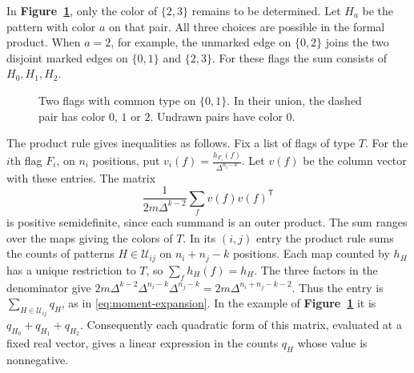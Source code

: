 In \textbf{Figure~\ref{fig:flag-union}}, only the color of $\{2,3\}$
remains to be determined. Let $H_a$ be the pattern with color $a$
on that pair. All three choices are possible in the formal product.
When $a=2$, for example, the unmarked edge on $\{0,2\}$ joins the
two disjoint marked edges on $\{0,1\}$ and $\{2,3\}$. For these flags
the sum consists of $H_0,H_1,H_2$.

\begin{figure}[htbp]
\centering
{}
\caption{Two flags with common type on $\{0,1\}$. In their union,
the dashed pair has color $0$, $1$ or $2$. Undrawn pairs have color $0$.}
\label{fig:flag-union}
\end{figure}

The product rule gives inequalities as follows. Fix a list of flags of
type $T$. For the $i$th flag $F_i$, on $n_i$ positions, put
$v_i(f)=\frac{h_{F_i}(f)}{\Delta^{n_i-k}}$. Let $v(f)$ be the column
vector with these entries. The matrix
\[
 \frac{1}{2m\Delta^{k-2}}\sum_f v(f)v(f)^{\mathsf T}
\]
is positive semidefinite, since each summand is an outer product.
The sum ranges over the maps giving the colors of $T$. In its
$(i,j)$ entry the product rule sums the counts of patterns
$H\in\mathcal U_{ij}$ on $n_i+n_j-k$ positions. Each map counted by
$h_H$ has a unique restriction to $T$, so $\sum_f h_H(f)=h_H$.
The three factors in the denominator give
$2m\Delta^{k-2}\Delta^{n_i-k}\Delta^{n_j-k}
=2m\Delta^{n_i+n_j-k-2}$. Thus the entry is
$\sum_{H\in\mathcal U_{ij}}q_H$, as in \eqref{eq:moment-expansion}.
In the example of \textbf{Figure~\ref{fig:flag-union}} it is
$q_{H_0}+q_{H_1}+q_{H_2}$. Consequently each quadratic form of this matrix, evaluated at a fixed
real vector, gives a linear expression in the counts $q_H$ whose
value is nonnegative.

